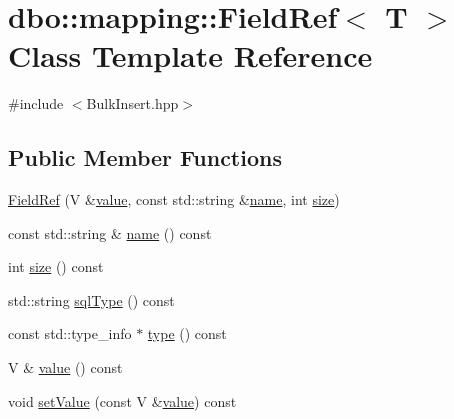 \hypertarget{classdbo_1_1mapping_1_1_field_ref}{\section{dbo\+:\+:mapping\+:\+:Field\+Ref$<$ T $>$ Class Template Reference}
\label{classdbo_1_1mapping_1_1_field_ref}
}


{\ttfamily \#include $<$Bulk\+Insert.\+hpp$>$}

\subsection*{Public Member Functions}
\begin{DoxyCompactItemize}
\item 
\hyperlink{classdbo_1_1mapping_1_1_field_ref_a6e90b688f02b8d7de0c5e6fbfbcf897c}{Field\+Ref} (V \&\hyperlink{classdbo_1_1mapping_1_1_field_ref_ad53542241b5f5e9f4055051f00ee7815}{value}, const std\+::string \&\hyperlink{classdbo_1_1mapping_1_1_field_ref_a6a5dbebdfd48f16fe8290ad8f0f304d3}{name}, int \hyperlink{classdbo_1_1mapping_1_1_field_ref_a84a3a0032b7dea68c65b5d66a6cb016f}{size})
\item 
const std\+::string \& \hyperlink{classdbo_1_1mapping_1_1_field_ref_a6a5dbebdfd48f16fe8290ad8f0f304d3}{name} () const 
\item 
int \hyperlink{classdbo_1_1mapping_1_1_field_ref_a84a3a0032b7dea68c65b5d66a6cb016f}{size} () const 
\item 
std\+::string \hyperlink{classdbo_1_1mapping_1_1_field_ref_af74da16080f2a33e08d4a4d8f46c06da}{sql\+Type} () const 
\item 
const std\+::type\+\_\+info $\ast$ \hyperlink{classdbo_1_1mapping_1_1_field_ref_a0a232586ede5bae838f6dafe14d771de}{type} () const 
\item 
V \& \hyperlink{classdbo_1_1mapping_1_1_field_ref_ad53542241b5f5e9f4055051f00ee7815}{value} () const 
\item 
void \hyperlink{classdbo_1_1mapping_1_1_field_ref_ae2736819ccc79e1cb054f1a58acde56d}{set\+Value} (const V \&\hyperlink{classdbo_1_1mapping_1_1_field_ref_ad53542241b5f5e9f4055051f00ee7815}{value}) const 
\end{DoxyCompactItemize}



